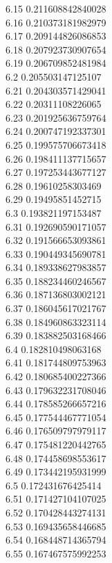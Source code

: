 {6.15	0.211608842840028\\
6.16	0.210373181982979\\
6.17	0.209144826086853\\
6.18	0.207923730907654\\
6.19	0.206709852481984\\
6.2	0.205503147125107\\
6.21	0.204303571429041\\
6.22	0.20311108226065\\
6.23	0.201925636759764\\
6.24	0.200747192337301\\
6.25	0.199575706673418\\
6.26	0.198411137715657\\
6.27	0.197253443677127\\
6.28	0.19610258303469\\
6.29	0.19495851452715\\
6.3	0.193821197153487\\
6.31	0.192690590171057\\
6.32	0.191566653093861\\
6.33	0.190449345690781\\
6.34	0.189338627983857\\
6.35	0.188234460246567\\
6.36	0.187136803002121\\
6.37	0.186045617021767\\
6.38	0.184960863323114\\
6.39	0.183882503168466\\
6.4	0.182810498063168\\
6.41	0.181744809753963\\
6.42	0.180685400227366\\
6.43	0.179632231708046\\
6.44	0.178585266657216\\
6.45	0.177544467771054\\
6.46	0.176509797979117\\
6.47	0.175481220442765\\
6.48	0.174458698553617\\
6.49	0.173442195931999\\
6.5	0.172431676425414\\
6.51	0.171427104107025\\
6.52	0.170428443274131\\
6.53	0.169435658446685\\
6.54	0.168448714365794\\
6.55	0.167467575992253\\
}
